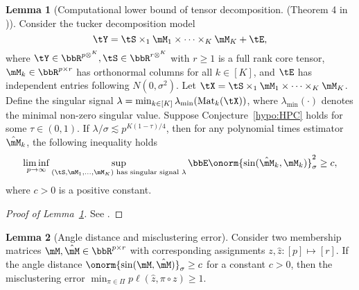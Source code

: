 \documentclass[lettersize,onecolumn,journal]{IEEEtran}
\theoremstyle{definition}
\newtheorem{lem}{Lemma}
\theoremstyle{definition}
\newcommand{\Mat}{\text{Mat}}
\def\fixme#1#2{\textbf{\color{red}[FIXME (#1): #2]}}
\begin{document}
\begin{lem}[Computational lower bound of tensor decomposition. (Theorem 4 in \cite{zhang2018tensor})]\label{lem:hpc} Consider the tucker decomposition model 
\begin{equation}
    \tY = \tS \times_1 \mM_1 \times \cdots \times_K \mM_K + \tE,
\end{equation}
where $\tY \in \bbR^{p\otimes^K }, \tS \in \bbR^{r \otimes^K}$ with $r \geq 1$ is a full rank core tensor, $\mM_k \in \bbR^{p \times r}$ has orthonormal columns for all $k \in [K]$, and $\tE$ has independent entries following $N(0,\sigma^2)$. Let $\tX = \tS \times_1 \mM_1 \times \cdots \times_K \mM_K $. Define the singular signal $\lambda = \min_{k \in [K]}\lambda_{\min} (\Mat_k(\tX))$, where $\lambda_{\min}(\cdot)$ denotes the minimal non-zero singular value. Suppose Conjecture~\ref{hypo:HPC} holds for some $\tau \in (0,1)$. If $\lambda /\sigma \lesssim p^{K(1- \tau)/4}$, then for any polynomial times estimator $\hat \mM_k$, the following inequality holds
\begin{align}
    \liminf_{p \rightarrow \infty} \sup_{(\tS, \mM_1,...,\mM_K) \text{ has singular signal }\lambda} \bbE \onorm{ \sin(\hat \mM_k, \mM_k) }^2_{\sigma} \geq c,
\end{align}
where $c >0$ is a positive constant. 
\end{lem}

\begin{proof}[Proof of Lemma~\ref{lem:hpc}]
See \citet[Proof of Theorem 4]{zhang2018tensor}.
\end{proof}


\begin{lem}[Angle distance and misclustering error]\label{lem:angle_mcr} Consider two membership matrices $\mM, \hat \mM \in \bbR^{p \times r}$ with corresponding assignments $z, \hat z: [p] \mapsto [r]$. If the angle distance $\onorm{\sin (\mM, \hat \mM)}_{\sigma} \geq c$ for a constant $c >0$, then the misclustering error $\min_{\pi \in \Pi}p\ell(\hat z,\pi \circ z )\geq 1$.
\end{lem}
\end{document}

